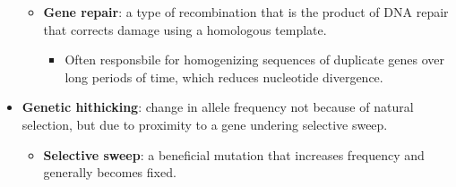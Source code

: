 \documentclass[12pt,a4paper]{article}
\begin{document}
\begin{itemize}
\begin{itemize}
            \item \textbf{Gene repair}: a type of recombination that is the product of DNA repair that corrects damage using a homologous template. 
                \begin{itemize}
                    \item Often responsbile for homogenizing sequences of duplicate genes over long periods of time, which reduces nucleotide divergence.
                \end{itemize}
        \end{itemize}
    \item \textbf{Genetic hithicking}: change in allele frequency not because of natural selection, but due to proximity to a gene undering selective sweep.
        \begin{itemize}
            \item \textbf{Selective sweep}: a beneficial mutation that increases frequency and generally becomes fixed. 
        \end{itemize}
\end{itemize}
\end{document}
